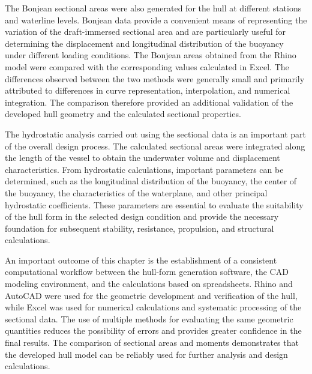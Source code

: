 \documentclass[12pt,a4paper,twoside]{report}
\begin{document}
\vspace{\baselineskip}\par\noindent The Bonjean sectional areas were also generated for the hull at different stations and waterline levels. Bonjean data provide a convenient means of representing the variation of the draft-immersed sectional area and are particularly useful for determining the displacement and longitudinal distribution of the buoyancy under different loading conditions. The Bonjean areas obtained from the Rhino model were compared with the corresponding values calculated in Excel. The differences observed between the two methods were generally small and primarily attributed to differences in curve representation, interpolation, and numerical integration. The comparison therefore provided an additional validation of the developed hull geometry and the calculated sectional properties.

\vspace{\baselineskip}\par\noindent The hydrostatic analysis carried out using the sectional data is an important part of the overall design process. The calculated sectional areas were integrated along the length of the vessel to obtain the underwater volume and displacement characteristics. From hydrostatic calculations, important parameters can be determined, such as the longitudinal distribution of the buoyancy, the center of the buoyancy, the characteristics of the waterplane, and other principal hydrostatic coefficients. These parameters are essential to evaluate the suitability of the hull form in the selected design condition and provide the necessary foundation for subsequent stability, resistance, propulsion, and structural calculations.

\vspace{\baselineskip}\par\noindent An important outcome of this chapter is the establishment of a consistent computational workflow between the hull-form generation software, the CAD modeling environment, and the calculations based on spreadsheets. Rhino and AutoCAD were used for the geometric development and verification of the hull, while Excel was used for numerical calculations and systematic processing of the sectional data. The use of multiple methods for evaluating the same geometric quantities reduces the possibility of errors and provides greater confidence in the final results. The comparison of sectional areas and moments demonstrates that the developed hull model can be reliably used for further analysis and design calculations.
\end{document}
